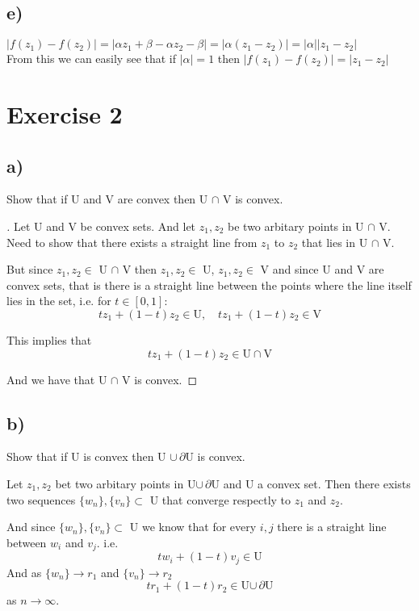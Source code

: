 \documentclass{article}
\begin{document}
\subsection*{e)}
$|f(z_1)-f(z_2)| = |\alpha z_1 + \beta - \alpha z_2 - \beta| = |\alpha(z_1 - z_2)|= |\alpha||z_1 - z_2|$\\
From this we can easily see that if $|\alpha| = 1$ then $|f(z_1) - f(z_2)| = |z_1 -z_2|$



\section*{Exercise 2}
\subsection*{a)}
Show that if U and V are convex then U $\cap$ V  is convex.

\begin{proof}[\unskip \nopunct]
  Let U and V be convex sets.
  And let $z_1, z_2$ be two arbitary points in U $\cap$ V. Need to show that there exists a straight line from $z_1$ to $z_2$ that lies in U $\cap$ V.

  But since $z_1, z_2 \in$ U $\cap$ V then $z_1, z_2 \in$ U, $z_1, z_2 \in$ V and since U and V are convex sets, that is there is a straight line between the points where the line itself lies in the set, i.e. for $t\in[0,1]$:
  \[tz_1 + (1-t)z_2 \in \text{U}, \quad tz_1 + (1-t)z_2 \in \text{V}\]

  This implies that
  \[tz_1 + (1-t)z_2 \in \text{U} \cap \text{V}\]

  And we have that U $\cap$ V is convex.

\end{proof}



\subsection*{b)}
Show that if U is convex then U $\cup \, \partial$U is convex.

Let $z_1, z_2$ bet two arbitary points in U$\cup \, \partial$U and U a convex set. Then there exists two sequences $\{w_n\}, \{v_n\} \subset$ U that converge respectly to $z_1$ and $z_2$.

And since $\{w_n\}, \{v_n\} \subset$ U we know that for every $i, j$ there is a straight line between $w_i$ and $v_j$. i.e.
\[tw_i +(1-t)v_j \in \text{U} \]
And as $\{w_n\} \rightarrow r_1$ and $\{v_n\} \rightarrow r_2$  
\[tr_1 +(1-t)r_2 \in \text{U$\cup \, \partial$U} \]
as $n \rightarrow \infty$.
\end{document}
